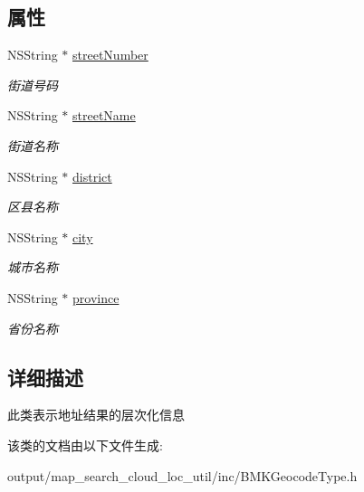 \subsection*{属性}
\begin{DoxyCompactItemize}
\item 
\hypertarget{interface_b_m_k_address_component_a7a9e0a709b4969472aa1b17a042975c8}{N\+S\+String $\ast$ \hyperlink{interface_b_m_k_address_component_a7a9e0a709b4969472aa1b17a042975c8}{street\+Number}}\label{interface_b_m_k_address_component_a7a9e0a709b4969472aa1b17a042975c8}

\begin{DoxyCompactList}\small\item\em 街道号码 \end{DoxyCompactList}\item 
\hypertarget{interface_b_m_k_address_component_afef3697cbdab210a40b85a4d628aa6b8}{N\+S\+String $\ast$ \hyperlink{interface_b_m_k_address_component_afef3697cbdab210a40b85a4d628aa6b8}{street\+Name}}\label{interface_b_m_k_address_component_afef3697cbdab210a40b85a4d628aa6b8}

\begin{DoxyCompactList}\small\item\em 街道名称 \end{DoxyCompactList}\item 
\hypertarget{interface_b_m_k_address_component_a3bb4c8b38bef483378a4ed4e0ec33aaa}{N\+S\+String $\ast$ \hyperlink{interface_b_m_k_address_component_a3bb4c8b38bef483378a4ed4e0ec33aaa}{district}}\label{interface_b_m_k_address_component_a3bb4c8b38bef483378a4ed4e0ec33aaa}

\begin{DoxyCompactList}\small\item\em 区县名称 \end{DoxyCompactList}\item 
\hypertarget{interface_b_m_k_address_component_ad7a30c029e65d37d09d106ca5cb55d1b}{N\+S\+String $\ast$ \hyperlink{interface_b_m_k_address_component_ad7a30c029e65d37d09d106ca5cb55d1b}{city}}\label{interface_b_m_k_address_component_ad7a30c029e65d37d09d106ca5cb55d1b}

\begin{DoxyCompactList}\small\item\em 城市名称 \end{DoxyCompactList}\item 
\hypertarget{interface_b_m_k_address_component_a849d581c8eaa3447b9aaa1764f7ac85c}{N\+S\+String $\ast$ \hyperlink{interface_b_m_k_address_component_a849d581c8eaa3447b9aaa1764f7ac85c}{province}}\label{interface_b_m_k_address_component_a849d581c8eaa3447b9aaa1764f7ac85c}

\begin{DoxyCompactList}\small\item\em 省份名称 \end{DoxyCompactList}\end{DoxyCompactItemize}


\subsection{详细描述}
此类表示地址结果的层次化信息 

该类的文档由以下文件生成\+:\begin{DoxyCompactItemize}
\item 
output/map\+\_\+search\+\_\+cloud\+\_\+loc\+\_\+util/inc/B\+M\+K\+Geocode\+Type.\+h\end{DoxyCompactItemize}
